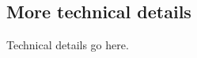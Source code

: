 \documentclass[article]{jss}
\begin{document}
\begin{appendix}

\section{More technical details} \label{app:technical}

%

Technical details go here. 



\end{appendix}
\end{document}
